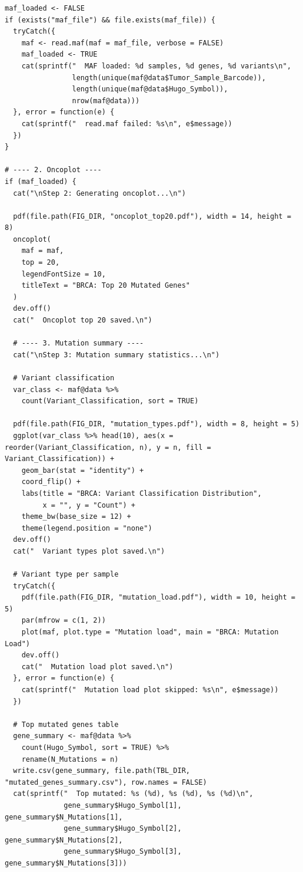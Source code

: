\documentclass[12pt,a4paper]{ctexart}
\begin{document}
\begin{lstlisting}[caption={12_advanced_algorithms}, basicstyle=\ttfamily\scriptsize]
maf_loaded <- FALSE
if (exists("maf_file") && file.exists(maf_file)) {
  tryCatch({
    maf <- read.maf(maf = maf_file, verbose = FALSE)
    maf_loaded <- TRUE
    cat(sprintf("  MAF loaded: %d samples, %d genes, %d variants\n",
                length(unique(maf@data$Tumor_Sample_Barcode)),
                length(unique(maf@data$Hugo_Symbol)),
                nrow(maf@data)))
  }, error = function(e) {
    cat(sprintf("  read.maf failed: %s\n", e$message))
  })
}

# ---- 2. Oncoplot ----
if (maf_loaded) {
  cat("\nStep 2: Generating oncoplot...\n")

  pdf(file.path(FIG_DIR, "oncoplot_top20.pdf"), width = 14, height = 8)
  oncoplot(
    maf = maf,
    top = 20,
    legendFontSize = 10,
    titleText = "BRCA: Top 20 Mutated Genes"
  )
  dev.off()
  cat("  Oncoplot top 20 saved.\n")

  # ---- 3. Mutation summary ----
  cat("\nStep 3: Mutation summary statistics...\n")

  # Variant classification
  var_class <- maf@data %>%
    count(Variant_Classification, sort = TRUE)

  pdf(file.path(FIG_DIR, "mutation_types.pdf"), width = 8, height = 5)
  ggplot(var_class %>% head(10), aes(x = reorder(Variant_Classification, n), y = n, fill = Variant_Classification)) +
    geom_bar(stat = "identity") +
    coord_flip() +
    labs(title = "BRCA: Variant Classification Distribution",
         x = "", y = "Count") +
    theme_bw(base_size = 12) +
    theme(legend.position = "none")
  dev.off()
  cat("  Variant types plot saved.\n")

  # Variant type per sample
  tryCatch({
    pdf(file.path(FIG_DIR, "mutation_load.pdf"), width = 10, height = 5)
    par(mfrow = c(1, 2))
    plot(maf, plot.type = "Mutation load", main = "BRCA: Mutation Load")
    dev.off()
    cat("  Mutation load plot saved.\n")
  }, error = function(e) {
    cat(sprintf("  Mutation load plot skipped: %s\n", e$message))
  })

  # Top mutated genes table
  gene_summary <- maf@data %>%
    count(Hugo_Symbol, sort = TRUE) %>%
    rename(N_Mutations = n)
  write.csv(gene_summary, file.path(TBL_DIR, "mutated_genes_summary.csv"), row.names = FALSE)
  cat(sprintf("  Top mutated: %s (%d), %s (%d), %s (%d)\n",
              gene_summary$Hugo_Symbol[1], gene_summary$N_Mutations[1],
              gene_summary$Hugo_Symbol[2], gene_summary$N_Mutations[2],
              gene_summary$Hugo_Symbol[3], gene_summary$N_Mutations[3]))


\end{lstlisting}
\end{document}
